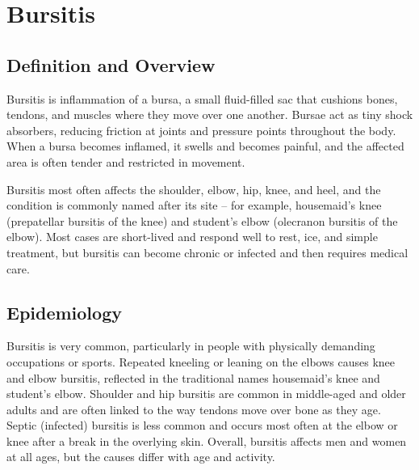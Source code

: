\chapter{Bursitis}

\section*{Definition and Overview}
Bursitis is inflammation of a bursa, a small fluid-filled sac that cushions bones, tendons, and muscles where they move over one another. Bursae act as tiny shock absorbers, reducing friction at joints and pressure points throughout the body. When a bursa becomes inflamed, it swells and becomes painful, and the affected area is often tender and restricted in movement.

Bursitis most often affects the shoulder, elbow, hip, knee, and heel, and the condition is commonly named after its site -- for example, housemaid's knee (prepatellar bursitis of the knee) and student's elbow (olecranon bursitis of the elbow). Most cases are short-lived and respond well to rest, ice, and simple treatment, but bursitis can become chronic or infected and then requires medical care.

\section*{Epidemiology}
Bursitis is very common, particularly in people with physically demanding occupations or sports. Repeated kneeling or leaning on the elbows causes knee and elbow bursitis, reflected in the traditional names housemaid's knee and student's elbow. Shoulder and hip bursitis are common in middle-aged and older adults and are often linked to the way tendons move over bone as they age. Septic (infected) bursitis is less common and occurs most often at the elbow or knee after a break in the overlying skin. Overall, bursitis affects men and women at all ages, but the causes differ with age and activity.

